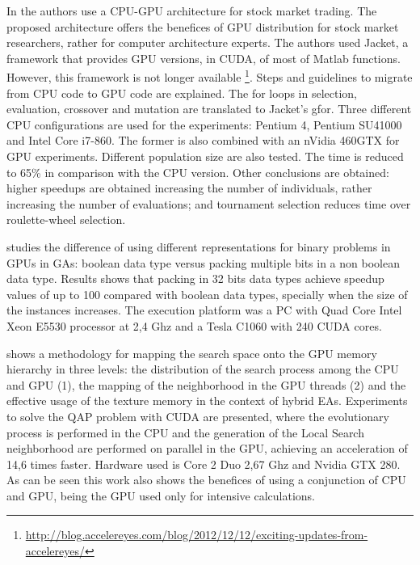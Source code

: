 \documentclass[prodmode,acmtecs]{acmsmall}
\begin{document}
In \cite{Contreras:2012:UGA:2150467.2150469} the authors use a CPU-GPU architecture for stock market trading. The proposed architecture offers the benefices of GPU distribution for stock market researchers, rather for computer architecture experts. The authors used Jacket, a framework that provides GPU versions, in CUDA, of most of Matlab functions. However, this framework is not longer available \footnote{\url{http://blog.accelereyes.com/blog/2012/12/12/exciting-updates-from-accelereyes/}}. Steps and guidelines to migrate from CPU code to GPU code are explained. The for loops in selection, evaluation, crossover and mutation are translated to Jacket's gfor. Three different CPU configurations are used for the experiments: Pentium 4, Pentium SU41000 and Intel Core i7-860. The former is also combined with an nVidia 460GTX for GPU experiments. Different population size are also tested. The time is reduced to 65\% in comparison with the CPU version. Other conclusions are obtained: higher speedups are obtained increasing the number of individuals, rather increasing the number of evaluations; and tournament selection reduces time over roulette-wheel selection. %




\cite{Pedemonte:2011:BOG:2001858.2002031} studies the difference of using different representations for binary problems in GPUs in GAs: boolean data type versus packing multiple bits in a non boolean data type. Results shows that
packing in 32 bits data types achieve speedup values of up to 100 compared with boolean data types, specially when the size of the instances increases. The execution platform was a PC with Quad Core Intel Xeon E5530 processor at 2,4 Ghz and a Tesla C1060 with 240 CUDA cores.

\cite{5586403} shows a methodology for mapping the search space onto the GPU memory hierarchy in three levels: the distribution of the search process among the CPU and GPU (1), the mapping of the neighborhood in the GPU threads (2) and the effective usage of the texture memory in the context of hybrid EAs. Experiments to solve the QAP problem with CUDA are presented, where the evolutionary process is performed in the CPU and the generation of the Local Search neighborhood are performed on parallel in the GPU, achieving an acceleration of 14,6 times faster. Hardware used is Core 2 Duo 2,67 Ghz and Nvidia GTX 280. As can be seen this work also shows the benefices of using a conjunction of CPU and GPU, being the GPU used only for intensive calculations. %
\end{document}
